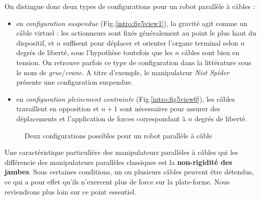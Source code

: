 On distingue donc deux types de configurations pour un robot parallèle à câbles 
:
\begin{itemize}
 \item en {\it configuration suspendue} (Fig.\ref{intro:fig5view1}), la gravité 
agit comme un câble virtuel : les actionneurs sont fixés généralement au point 
le plus haut du dispositif, et $n$ suffisent pour déplacer et orienter l'organe 
terminal selon $n$ degrés de liberté, sous l'hypoth\`ese toutefois que les $n$ 
c\^ables sont bien en tension. On retrouve parfois ce type de 
configuration dans la littérature sous le nom de {\it grue}/{\it crane}. A 
titre d'exemple, le manipulateur {\it Nist Spider} 
\cite{1992:Albus.Bostelman.ea} présente une configuration suspendue.
 \item en {\it configuration pleinement contrainte} 
(Fig.\ref{intro:fig5view0}), 
les câbles travaillent en opposition et $n+1$ sont nécessaires pour assurer des 
déplacements et l'application de forces correspondant à $n$ degrés de liberté.
\end{itemize}

\begin{figure}[!ht]
  \centering
\hfill
    \caption{\footnotesize Deux configurations possibles pour un robot 
parallèle 
à câble}
\label{intro:fig5}
\end{figure}

Une caractéristique particulière des manipulateurs parallèles à câbles qui les 
différencie des manipulateurs parallèles classiques est la {\bf non-rigidité 
des jam\-bes}. Sous certaines conditions, un ou plusieurs câbles peuvent être 
détendus, ce qui a pour effet qu'ils n'exercent plus de force sur la 
plate-forme. Nous reviendrons plus loin sur ce point essentiel.

